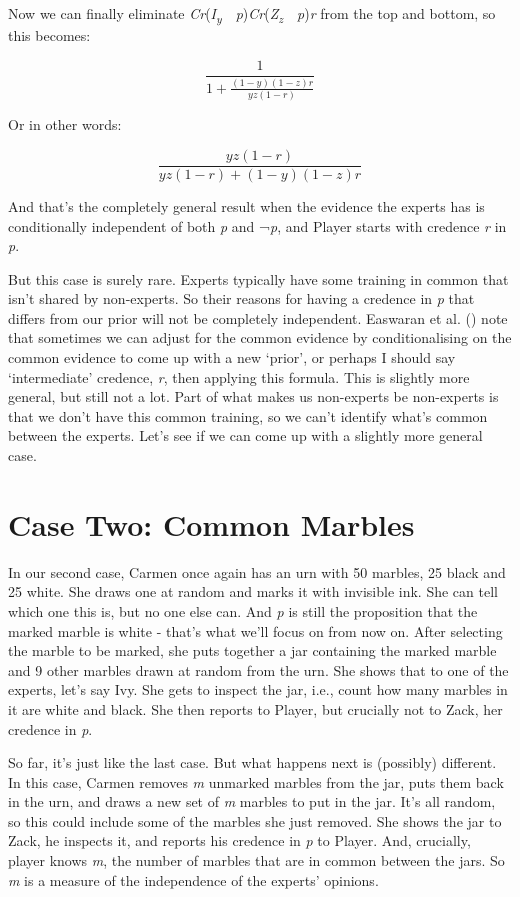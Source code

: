\documentclass[
  11pt,
  letterpaper,
  DIV=11,
  numbers=noendperiod,
  twoside]{scrartcl}
\begin{document}
Now we can finally eliminate
\emph{Cr}(\emph{I\textsubscript{y}}~\textbar~\emph{p})\emph{Cr}(\emph{Z\textsubscript{z}}~\textbar~\emph{p})\emph{r}
from the top and bottom, so this becomes:

\[
\frac{1}{1 + \frac{(1-y)(1-z)r}{yz(1-r)}}
\]

Or in other words:

\[
\frac{yz(1-r)}{yz(1-r) + (1-y)(1-z)r}
\]

And that's the completely general result when the evidence the experts
has is conditionally independent of both \emph{p} and ¬\emph{p}, and
Player starts with credence \emph{r} in \emph{p}.

But this case is surely rare. Experts typically have some training in
common that isn't shared by non-experts. So their reasons for having a
credence in \emph{p} that differs from our prior will not be completely
independent. Easwaran et al. ()
note that sometimes we can adjust for the common evidence by
conditionalising on the common evidence to come up with a new `prior',
or perhaps I should say `intermediate' credence, \emph{r}, then applying
this formula. This is slightly more general, but still not a lot. Part
of what makes us non-experts be non-experts is that we don't have this
common training, so we can't identify what's common between the experts.
Let's see if we can come up with a slightly more general case.

\section{Case Two: Common Marbles}\label{case-two-common-marbles}

In our second case, Carmen once again has an urn with 50 marbles, 25
black and 25 white. She draws one at random and marks it with invisible
ink. She can tell which one this is, but no one else can. And \emph{p}
is still the proposition that the marked marble is white - that's what
we'll focus on from now on. After selecting the marble to be marked, she
puts together a jar containing the marked marble and 9 other marbles
drawn at random from the urn. She shows that to one of the experts,
let's say Ivy. She gets to inspect the jar, i.e., count how many marbles
in it are white and black. She then reports to Player, but crucially not
to Zack, her credence in \emph{p}.

So far, it's just like the last case. But what happens next is
(possibly) different. In this case, Carmen removes \emph{m} unmarked
marbles from the jar, puts them back in the urn, and draws a new set of
\emph{m} marbles to put in the jar. It's all random, so this could
include some of the marbles she just removed. She shows the jar to Zack,
he inspects it, and reports his credence in \emph{p} to Player. And,
crucially, player knows \emph{m}, the number of marbles that are in
common between the jars. So \emph{m} is a measure of the independence of
the experts' opinions.
\end{document}
